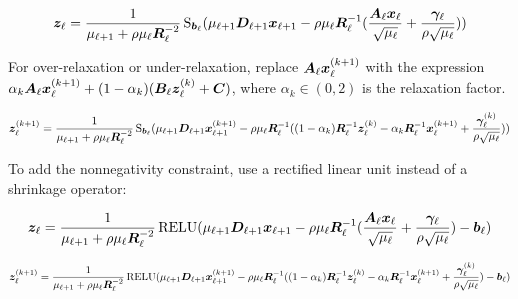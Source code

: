 \documentclass{article}
\begin{document}
\begin{equation}
\bm{z}_{\ell} = \frac{1}{\mu_{\ell + 1} + \rho\mu_{\ell}\bm{R}_{\ell}^{-2}}\operatorname{S}_{\bm{b}_{\ell}}(\mu_{\ell + 1}\bm{D}_{\ell + 1}\bm{x}_{\ell + 1} - \rho\mu_{\ell}\bm{R}_{\ell}^{-1}(\frac{\bm{A}_{\ell}\bm{x}_{\ell}}{\sqrt{\mu_{\ell}}} + \frac{\bm{\gamma}_{\ell}}{\rho\sqrt{\mu_{\ell}}}))
\end{equation}

For over-relaxation or under-relaxation, replace $\bm{A}_{\ell}\bm{x}_{\ell}^{(k + 1)}$ with the expression $\alpha_k\bm{A}_{\ell}\bm{x}_{\ell}^{(k + 1)} + (1 - \alpha_k)(\bm{B}_{\ell}\bm{z}_{\ell}^{(k)} + \bm{C})$, where $\alpha_k \in (0,2)$ is the relaxation factor.

\begin{equation}
\bm{z}_{\ell}^{(k + 1)} = \frac{1}{\mu_{\ell + 1} + \rho\mu_{\ell}\bm{R}_{\ell}^{-2}}\operatorname{S}_{\bm{b}_{\ell}}(\mu_{\ell + 1}\bm{D}_{\ell + 1}\bm{x}_{\ell + 1}^{(k + 1)} - \rho\mu_{\ell}\bm{R}_{\ell}^{-1}((1 - \alpha_k)\bm{R}_{\ell}^{-1}\bm{z}_{\ell}^{(k)} - \alpha_k\bm{R}_{\ell}^{-1}\bm{x}_{\ell}^{(k + 1)} + \frac{\bm{\gamma}_{\ell}^{(k)}}{\rho\sqrt{\mu_{\ell}}}))
\end{equation}

To add the nonnegativity constraint, use a rectified linear unit instead of a shrinkage operator:

\begin{equation}
\bm{z}_{\ell} = \frac{1}{\mu_{\ell + 1} + \rho\mu_{\ell}\bm{R}_{\ell}^{-2}}\operatorname{RELU}(\mu_{\ell + 1}\bm{D}_{\ell + 1}\bm{x}_{\ell + 1} - \rho\mu_{\ell}\bm{R}_{\ell}^{-1}(\frac{\bm{A}_{\ell}\bm{x}_{\ell}}{\sqrt{\mu_{\ell}}} + \frac{\bm{\gamma}_{\ell}}{\rho\sqrt{\mu_{\ell}}}) - \bm{b}_{\ell})
\end{equation}

\begin{equation}
\bm{z}_{\ell}^{(k + 1)} = \frac{1}{\mu_{\ell + 1} + \rho\mu_{\ell}\bm{R}_{\ell}^{-2}}\operatorname{RELU}(\mu_{\ell + 1}\bm{D}_{\ell + 1}\bm{x}_{\ell + 1}^{(k + 1)} - \rho\mu_{\ell}\bm{R}_{\ell}^{-1}((1 - \alpha_k)\bm{R}_{\ell}^{-1}\bm{z}_{\ell}^{(k)} - \alpha_k\bm{R}_{\ell}^{-1}\bm{x}_{\ell}^{(k + 1)} + \frac{\bm{\gamma}_{\ell}^{(k)}}{\rho\sqrt{\mu_{\ell}}}) - \bm{b}_{\ell})
\end{equation}
\end{document}
